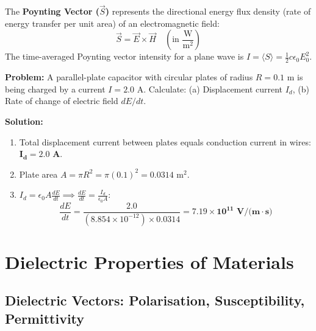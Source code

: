 \documentclass[12pt,a4paper]{article}
\begin{document}
\begin{tcolorbox}[defbox, title={\textbf{Definition: Poynting Vector}}]
The \textbf{Poynting Vector ($\vec{S}$)} represents the directional energy flux density (rate of energy transfer per unit area) of an electromagnetic field:
\begin{equation}
\vec{S} = \vec{E} \times \vec{H} \quad \left(\text{in } \frac{\text{W}}{\text{m}^2}\right)
\end{equation}
The time-averaged Poynting vector intensity for a plane wave is $I = \langle S \rangle = \frac{1}{2} c \epsilon_0 E_0^2$.
\end{tcolorbox}

\begin{tcolorbox}[examplebox, title={\textbf{Solved Problem 1: Displacement Current in a Capacitor}}]
\textbf{Problem:} A parallel-plate capacitor with circular plates of radius $R = 0.1\text{ m}$ is being charged by a current $I = 2.0\text{ A}$. Calculate: (a) Displacement current $I_d$, (b) Rate of change of electric field $dE/dt$.

\textbf{Solution:}\par\noindent
\begin{enumerate}[leftmargin=*, itemsep=2pt]
  \item Total displacement current between plates equals conduction current in wires: $\mathbf{I_d = 2.0\text{ A}}$.
  \item Plate area $A = \pi R^2 = \pi (0.1)^2 = 0.0314\text{ m}^2$.
  \item $I_d = \epsilon_0 A \frac{dE}{dt} \implies \frac{dE}{dt} = \frac{I_d}{\epsilon_0 A}$:
   \begin{equation}
   \frac{dE}{dt} = \frac{2.0}{(8.854 \times 10^{-12}) \times 0.0314} = \mathbf{7.19 \times 10^{11}\text{ V/(m}\cdot\text{s)}}
   \end{equation}
\end{enumerate}
\end{tcolorbox}

\section{Dielectric Properties of Materials}

\subsection{Dielectric Vectors: Polarisation, Susceptibility, Permittivity}
\end{document}

